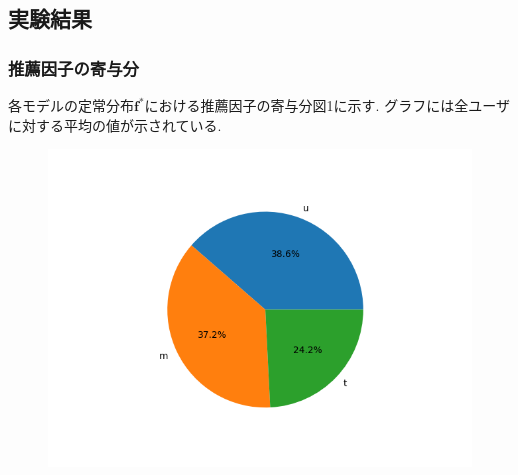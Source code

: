 \documentclass[a4j,11pt]{jarticle}           %
\begin{document}
	\subsection{実験結果}
	\subsubsection{推薦因子の寄与分}
	各モデルの定常分布$\textbf{f}^*$における推薦因子の寄与分図1に示す. グラフには全ユーザに対する平均の値が示されている. 

	\begin{figure}[H]
		\centering
		\includegraphics[bb=0 0 360 270, width=\hsize]{img/Figure_1.png}
	\end{figure}
	
\end{document}
